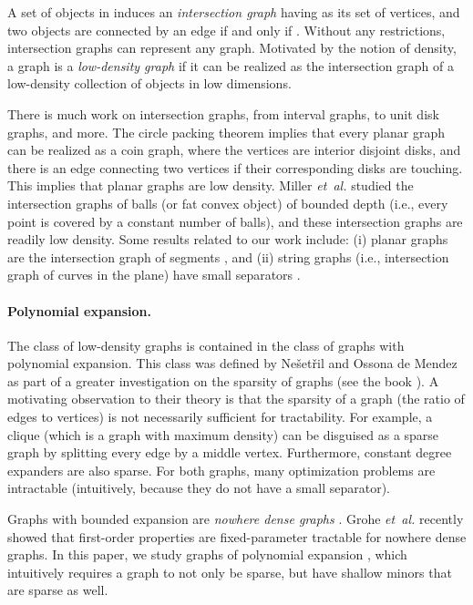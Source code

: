 \documentclass[12pt]{article}
\newcommand{\etal}{\textit{et~al.}\xspace}
\theoremstyle{remark}\theoremheaderfont{\sf}\theorembodyfont{\upshape}
\numberwithin{figure}{section}\numberwithin{table}{section}\numberwithin{equation}{section}
\newcommand{\Nesetril}{N{e{\v s}et{\v r}il}\xspace}
\newcommand{\si}[1]{#1}
\begin{document}
A set  of objects in  induces an \emph{intersection
  graph}  having  as its set of vertices,
and two objects  are connected by an edge if
and only if .  Without any
restrictions, intersection graphs can represent any graph. Motivated
by the notion of density, a graph is a \emph{low-density graph} if it
can be realized as the intersection graph of a low-density collection
of objects in low dimensions.

There is much work on intersection graphs, from interval graphs, to
unit disk graphs, and more. The circle packing theorem
\cite{k-kdka-36,a-ocpls-70,pa-cg-95} implies that every planar graph
can be realized as a coin graph, where the vertices are interior
disjoint disks, and there is an edge connecting two vertices if their
corresponding disks are touching. This implies that planar graphs are
low density.  Miller \etal \cite{mttv-sspnng-97} studied the
intersection graphs of balls (or fat convex object) of bounded depth
(i.e., every point is covered by a constant number of balls), and
these intersection graphs are readily low density. Some results
related to our work include: (i) planar graphs are the intersection
graph of segments \cite{cg-epgig-09}, and (ii) string graphs (i.e.,
intersection graph of curves in the plane) have small separators
\cite{m-nossg-14}.

\paragraph{Polynomial expansion.}

The class of low-density graphs is contained in the class of graphs
with polynomial expansion. This class was defined by \Nesetril and
Ossona \si{de} Mendez as part of a greater investigation on the
sparsity of graphs (see the book \cite{no-s-12}). A motivating
observation to their theory is that the sparsity of a graph (the ratio
of edges to vertices) is not necessarily sufficient for tractability.
For example, a clique (which is a graph with maximum density) can be
disguised as a sparse graph by splitting every edge by a middle
vertex. Furthermore, constant degree expanders are also sparse.  For
both graphs, many optimization problems are intractable (intuitively,
because they do not have a small separator).

Graphs with bounded expansion are \emph{nowhere dense graphs}
\cite[Section 5.4]{no-s-12}. Grohe \etal \cite{gks-dfopndg-14}
recently showed that first-order properties are fixed-parameter
tractable for nowhere dense graphs. In this paper, we study graphs of
polynomial expansion \cite[Section 5.5]{no-s-12}, which intuitively
requires a graph to not only be sparse, but have shallow minors that
are sparse as well.
\end{document}
